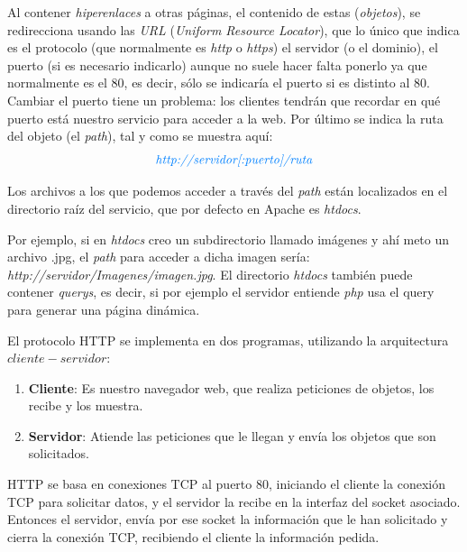 \documentclass[10pt,a4paper,spanish]{report}
\begin{document}
Al contener \textit{\textcolor{tema2}{hiperenlaces}} a otras páginas, el contenido de estas (\textit{\textcolor{tema2}{objetos}}), se redirecciona usando las \textit{\textcolor{tema2}{URL}} (\textit{Uniform Resource Locator}), que lo único que indica es el protocolo (que normalmente es \textit{\textcolor{tema2}{http}} o \textit{\textcolor{tema2}{https}}) el servidor (o el dominio), el puerto (si es necesario indicarlo) aunque no suele hacer falta ponerlo ya que normalmente es el 80, es decir, sólo se indicaría el puerto si es distinto al 80. Cambiar el puerto tiene un problema: los clientes tendrán que recordar en qué puerto está nuestro servicio para acceder a la web. Por último se indica la ruta del objeto (el \textit{path}), tal y como se muestra aquí:
\begin{displaymath}
  \textit{\textcolor{tema2}{http://servidor[:puerto]/ruta}}
\end{displaymath}

Los archivos a los que podemos acceder a través del \textit{path} están localizados en el directorio raíz del servicio, que por defecto en Apache es \textit{htdocs}. 

Por ejemplo, si en \textit{htdocs} creo un subdirectorio llamado imágenes y ahí meto un archivo .jpg, el \textit{path} para acceder a dicha imagen sería: \textit{http://servidor/Imagenes/imagen.jpg}. El directorio \textit{htdocs} también puede contener \textit{querys}, es decir, si por ejemplo el servidor entiende \textit{php} usa el query para generar una página dinámica.

El protocolo HTTP se implementa en dos programas, utilizando la arquitectura $cliente-servidor$:
\begin{enumerate}[$\spadesuit$]
  \item \textbf{\textcolor{tema2}{Cliente}}: Es nuestro navegador web, que realiza peticiones de objetos, los recibe y los muestra. 
  \item \textbf{\textcolor{tema2}{Servidor}}: Atiende las peticiones que le llegan y envía los objetos que son solicitados.
\end{enumerate}

HTTP se basa en conexiones TCP al puerto 80, iniciando el cliente la conexión TCP para solicitar datos, y el servidor la recibe en la interfaz del socket asociado. Entonces el servidor, envía por ese socket la información que le han solicitado y cierra la conexión TCP, recibiendo el cliente la información pedida.
\end{document}
